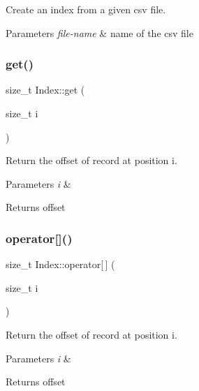 Create an index from a given csv file.


\begin{DoxyParams}{Parameters}
{\em file-\/name} & name of the csv file \\
\hline
\end{DoxyParams}
\mbox{\label{class_index_a83ff6cc2f792e8d264ba1f56439cf505}} 
\subsubsection{\texorpdfstring{get()}{get()}}
{\footnotesize\ttfamily size\+\_\+t Index\+::get (\begin{DoxyParamCaption}\item[{size\+\_\+t}]{i }\end{DoxyParamCaption})}

Return the offset of record at position i.


\begin{DoxyParams}{Parameters}
{\em i} & \\
\hline
\end{DoxyParams}
\begin{DoxyReturn}{Returns}
offset 
\end{DoxyReturn}
\mbox{\label{class_index_a9ccd3ac197c7a463064c22515e77bfe1}} 
\subsubsection{\texorpdfstring{operator[]()}{operator[]()}}
{\footnotesize\ttfamily size\+\_\+t Index\+::operator\mbox{[}$\,$\mbox{]} (\begin{DoxyParamCaption}\item[{size\+\_\+t}]{i }\end{DoxyParamCaption})}

Return the offset of record at position i.


\begin{DoxyParams}{Parameters}
{\em i} & \\
\hline
\end{DoxyParams}
\begin{DoxyReturn}{Returns}
offset 
\end{DoxyReturn}
\mbox{\label{class_index_ad125463c2df0e7af560698384dd5924b}} 
